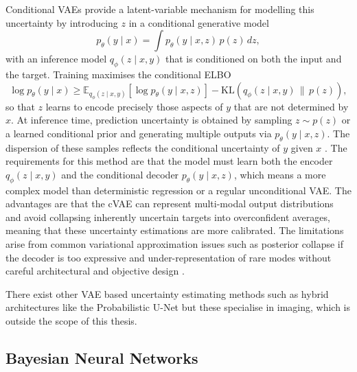 Conditional VAEs provide a latent-variable mechanism for modelling this uncertainty by introducing $z$ in a conditional generative model
\begin{equation}
p_\theta(y\mid x)=\int p_\theta(y\mid x,z)\,p(z)\,dz,
\end{equation}
with an inference model $q_\phi(z\mid x,y)$ that is conditioned on both the input and the target. Training maximises the conditional ELBO
\begin{equation}
\log p_\theta(y\mid x)\ge
\mathbb{E}_{q_\phi(z\mid x,y)}\!\left[\log p_\theta(y\mid x,z)\right]
-
\mathrm{KL}\!\left(q_\phi(z\mid x,y)\,\|\,p(z)\right),
\end{equation}
so that $z$ learns to encode precisely those aspects of $y$ that are not determined by $x$. At inference time, prediction uncertainty is obtained by sampling $z\sim p(z)$ or a learned conditional prior and generating multiple outputs via $p_\theta(y\mid x,z)$. The dispersion of these samples reflects the conditional uncertainty of $y$ given $x$ \cite{Sohn2015}. The requirements for this method are that the model must learn both the encoder $q_\phi(z\mid x,y)$ and the conditional decoder $p_\theta(y\mid x,z)$, which means a more complex model than deterministic regression or a regular unconditional VAE. The advantages are that the cVAE can represent multi-modal output distributions and avoid collapsing inherently uncertain targets into overconfident averages, meaning that these uncertainty estimations are more calibrated. The limitations arise from common variational approximation issues such as posterior collapse if the decoder is too expressive and under-representation of rare modes without careful architectural and objective design \cite{Sohn2015}.

There exist other VAE based uncertainty estimating methods such as hybrid architectures like the Probabilistic U-Net \cite{Kohl2018} but these specialise in imaging, which is outside the scope of this thesis.

\subsection{Bayesian Neural Networks}

